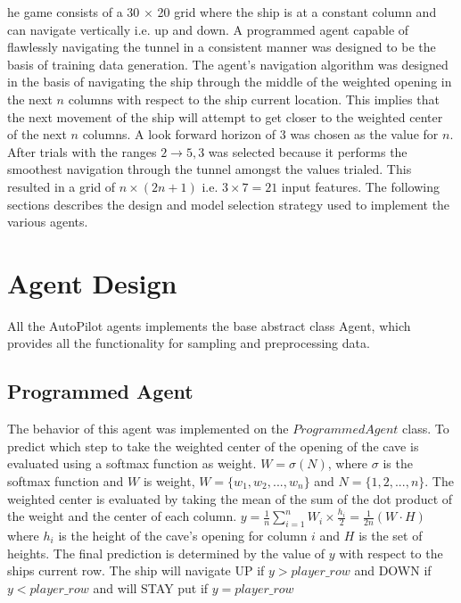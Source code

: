 \documentclass[10pt,journal,compsoc]{IEEEtran}
\begin{document}
he game consists
of a 30 $\times$ 20 grid where the ship is at a constant column and can navigate vertically i.e. up and 
down. A programmed agent capable of flawlessly navigating the tunnel in a consistent manner was designed
to be the basis of training data generation. The agent's navigation algorithm was designed in the basis 
of navigating the ship through the middle of the weighted opening in the next $n$ columns with respect to 
the ship current location. This implies that the next movement of the ship will attempt to get closer to 
the weighted center of the next $n$ columns. A look forward horizon of $3$ was chosen as the value for $n$.
After trials with the ranges $2 \to 5, 3$ was selected because it performs the smoothest navigation through
the tunnel amongst the values trialed. This resulted in a grid of $n \times (2n + 1)$ i.e. $3 \times 7 = 21$ 
input features. The following sections describes the design and model selection strategy used to implement
the various agents. 

\section{Agent Design}
All the AutoPilot agents implements the base abstract class Agent, which provides all the functionality for 
sampling and preprocessing data. 


\subsection{Programmed Agent}

The behavior of this agent was implemented on the $ProgrammedAgent$ class. To predict which step to take the
weighted center of the opening of the cave is evaluated using a softmax function as weight. $W = \sigma(N)$,
where $\sigma$ is the softmax function and $W$ is weight, $W = \{w_1, w_2, ..., w_n\}$ and $N = \{1, 2, ..., 
n\}$. The weighted center is evaluated by taking the mean of the sum of the dot product of the weight and 
the center of each column. $y = \frac{1}{n}\sum\limits_{i=1}^{n}W_i \times \frac{h_i}{2} = \frac{1}{2n}
(W \cdot H)$ where $h_i$ is the height of the cave's opening for column $i$ and $H$ is the set of heights. 
The final prediction is determined by the value of $y$ with 
respect to the ships current row. The ship will navigate UP if $y > player\_row$ and DOWN if $y 
< player\_row$ and will STAY put if $y = player\_row$
\end{document}
